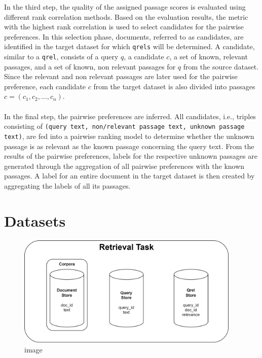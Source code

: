 In the third step, the quality of the assigned passage scores is evaluated using different rank correlation methods. Based on the evaluation results, the metric with the highest rank correlation is used to select candidates for the pairwise preferences. In this selection phase, documents, referred to as candidates, are identified in the target dataset for which \texttt{qrels} will be determined. A candidate, similar to a \texttt{qrel}, consists of a query $q$, a candidate $c$, a set of known, relevant passages, and a set of known, non relevant passages for $q$ from the source dataset. Since the relevant and non relevant passages are later used for the pairwise preference, each candidate $c$ from the target dataset is also divided into passages $c=(c_1, c_2, ..., c_n)$.
\\\\
In the final step, the pairwise preferences are inferred. All candidates, i.e., triples consisting of \texttt{(query text, non/relevant passage text, unknown passage text)}, are fed into a pairwise ranking model to determine whether the unknown passage is as relevant as the known passage concerning the query text. From the results of the pairwise preferences, labels for the respective unknown passages are generated through the aggregation of all pairwise preferences with the known passages. A label for an entire document in the target dataset is then created by aggregating the labels of all its passages.

\pagebreak


\section{Datasets}\label{datasets}

\begin{figure}[ht]
    \centering
    \includegraphics[width=0.95\textwidth]{./graphics/drawio/datasets.png}
    \caption{image}
\end{figure}

